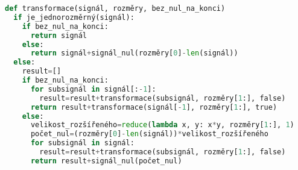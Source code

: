 \begin{lstlisting}[language=python,caption=Převod nrozměrného signálu na jednorozměrný,label=code:ndimensional_transform]
def transformace(signál, rozměry, bez_nul_na_konci)
  if je_jednorozměrný(signál):
    if bez_nul_na_konci:
      return signál
    else:
      return signál+signál_nul(rozměry[0]-len(signál))
  else:
    result=[]
    if bez_nul_na_konci:
      for subsignál in signál[:-1]:
        result=result+transformace(subsignál, rozměry[1:], false)
      return result+transformace(signál[-1], rozměry[1:], true)
    else:
      velikost_rozšířeného=reduce(lambda x, y: x*y, rozměry[1:], 1)
      počet_nul=(rozměry[0]-len(signál))*velikost_rozšířeného
      for subsignál in signál:
        result=result+transformace(subsignál, rozměry[1:], false)
      return result+signál_nul(počet_nul)
\end{lstlisting}
